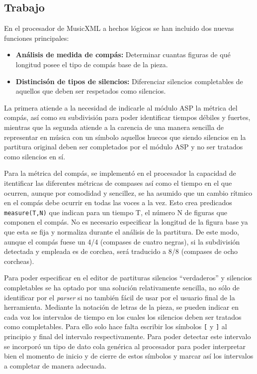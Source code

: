 \subsection{Trabajo}
\label{subsec:fifth_iteration_work}
En el procesador de MusicXML a hechos lógicos se han incluido dos nuevas funciones principales: 
\begin{itemize}
	\item \textbf{Análisis de medida de compás:} Determinar cuantas figuras de qué longitud posee el tipo de compás base de la pieza.
	\item \textbf{Distincisón de tipos de silencios:} Diferenciar silencios completables de aquellos que deben ser respetados como silencios.
\end{itemize}
La primera atiende a la necesidad de indicarle al módulo ASP la métrica del compás, así como su subdivisión para poder identificar tiempos débiles y fuertes, mientras que la segunda atiende a la carencia de una manera sencilla de representar en música con un símbolo aquellos huecos que siendo silencios en la partitura original deben ser completados por el módulo ASP y no ser tratados como silencios en sí. 

Para la métrica del compás, se implementó en el procesador la capacidad de itentificar las diferentes métricas de compases así como el tiempo en el que ocurren, aunque por comodidad y sencillez, se ha asumido que un cambio rítmico en el compás debe ocurrir en todas las voces a la vez. Esto crea predicados \texttt{measure(T,N)} que indican para un tiempo T, el número N de figuras que componen el compás. No es necesario especificar la longitud de la figura base ya que esta se fija y normaliza durante el análisis de la partitura. De este modo, aunque el compás fuese un 4/4 (compases de cuatro negras), si la subdivisión detectada y empleada es de corchea, será traducido a 8/8 (compases de ocho corcheas). 

Para poder especificar en el editor de partituras silencios ``verdaderos'' y silencios completables se ha optado por una solución relativamente sencilla, no sólo de identificar por el \textit{parser} si no también fácil de usar por el usuario final de la herramienta. Mediante la notación de letras de la pieza, se pueden indicar en cada voz los intervalos de tiempo en los cuales los silencios deben ser tratados como completables. Para ello solo hace falta escribir los símbolos \texttt{[} y \texttt{]} al principio y final del intervalo respectivamente. Para poder detectar este intervalo se incorporó un tipo de dato cola genérica al procesador para poder interpretar bien el momento de inicio y de cierre de estos símbolos y marcar así los intervalos a completar de manera adecuada.

